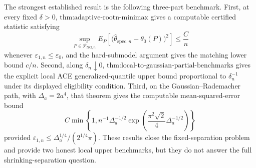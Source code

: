 The strongest established result is the following three-part benchmark.  First, at every fixed \(\delta>0\), \(\text{thm:adaptive-rootn-minimax}\) gives a computable certified statistic satisfying
\[
 \sup_{P\in\mathcal P_{\mathrm{NG},n}}
 E_P\!\left[
   \bigl(\widehat\theta_{\mathrm{spec},n}-\theta_0(P)\bigr)^2
 \right]
 \le \frac{C}{n}
\]
whenever \(\varepsilon_{1,n}\le\varepsilon_0\), and the hard-submodel argument gives the matching lower bound \(c/n\).  Second, along \(\delta_n\downarrow0\), \(\text{thm:local-to-gaussian-partial-benchmarks}\) gives the explicit local ACE generalized-quantile upper bound proportional to \(\delta_n^{-1}\) under its displayed eligibility condition.  Third, on the Gaussian--Rademacher path, with \(\Delta_a=2a^4\), that theorem gives the computable mean-squared-error bound
\[
 C\min\!\left\{
  1,
  n^{-1}\Delta_a^{-1/2}
  \exp\!\left(
    \frac{\pi^2\sqrt2}{4}\Delta_a^{-1/2}
  \right)
 \right\}
\]
provided \(\varepsilon_{1,n}\le\Delta_a^{1/4}/(2^{1/4}\pi)\).  These results close the fixed-separation problem and provide two honest local upper benchmarks, but they do not answer the full shrinking-separation question.